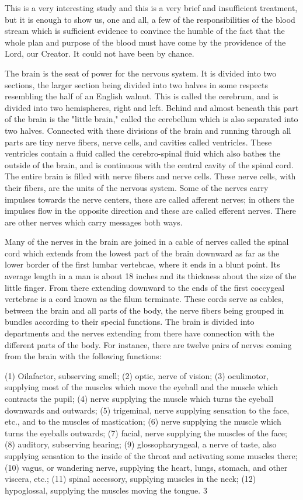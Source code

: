This is a very interesting study and this is a very brief and insufficient treatment, but it is
enough to show us, one and all, a few of the responsibilities of the blood stream which is
sufficient evidence to convince the humble of the fact that the whole plan and purpose of the
blood must have come by the providence of the Lord, our Creator. It could not have been by
chance.

The brain is the seat of power for the nervous system. It is divided into two sections, the
larger section being divided into two halves in some respects resembling the half of an
English walnut. This is called the cerebrum, and is divided into two hemispheres, right and
left. Behind and almost beneath this part of the brain is the "little brain," called the
cerebellum which is also separated into two halves. Connected with these divisions of the
brain and running through all parts are tiny nerve fibers, nerve cells, and cavities called
ventricles. These ventricles contain a fluid called the cerebro-spinal fluid which also bathes
the outside of the brain, and is continuous with the central cavity of the spinal cord. The
entire brain is filled with nerve fibers and nerve cells. These nerve cells, with their fibers, are
the units of the nervous system. Some of the nerves carry impulses towards the nerve centers,
these are called afferent nerves; in others the impulses flow in the opposite direction and
these are called efferent nerves. There are other nerves which carry messages both ways.

Many of the nerves in the brain are joined in a cable of nerves called the spinal cord which
extends from the lowest part of the brain downward as far as the lower border of the first
lumbar vertebrae, where it ends in a blunt point. Its average length in a man is about 18
inches and its thickness about the size of the little finger. From there extending downward to
the ends of the first coccygeal vertebrae is a cord known as the filum terminate. These cords
serve as cables, between the brain and all parts of the body, the nerve fibers being grouped in
bundles according to their special functions. The brain is divided into departments and the
nerves extending from there have connection with the different parts of the body. For
instance, there are twelve pairs of nerves coming from the brain with the following functions:

(1) Oilafactor, subserving smell; (2) optic, nerve of vision; (3) oculimotor, supplying most of
the muscles which move the eyeball and the muscle which contracts the pupil; (4) nerve
supplying the muscle which turns the eyeball downwards and outwards; (5) trigeminal, nerve
supplying sensation to the face, etc., and to the muscles of mastication; (6) nerve supplying
the muscle which turns the eyeballs outwards; (7) facial, nerve supplying the muscles of the
face; (8) auditory, subserving hearing; (9) glossopharyngeal, a nerve of taste, also supplying
sensation to the inside of the throat and activating some muscles there; (10) vagus, or
wandering nerve, supplying the heart, lungs, stomach, and other viscera, etc.; (11) spinal
accessory, supplying muscles in the neck; (12) hypoglossal, supplying the muscles moving
the tongue. 3

